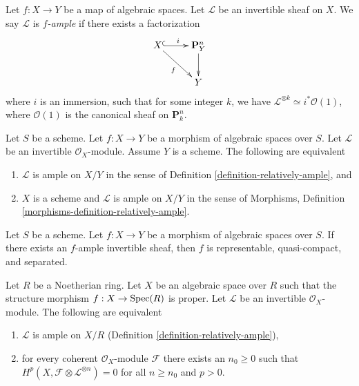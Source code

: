 \begin{definition}[{\cite[II, Def.\ 7.9]{Kn}}]\label{definition-knutson-ample}
  Let $f : X \to Y$ be a map of algebraic spaces. Let $\mathcal{L}$ be an
  invertible sheaf on $X$. We say $\mathcal{L}$ is {\it $f$-ample} if there
  exists a factorization
  $$
  \xymatrix{
    X \ar@{^{(}->}[r]^i\ar[dr]_f & \mathbf{P}^n_Y \ar[d]\\
    & Y
  }
  $$
  where $i$ is an immersion, such that for some integer $k$, we have
  $\mathcal{L}^{\otimes k} \simeq i^*\mathcal{O}(1)$, where $\mathcal{O}(1)$ is
  the canonical sheaf on $\mathbf{P}^n_k$.
\end{definition}

\begin{lemma}
\label{lemma-relatively-ample-sanity-check}
Let $S$ be a scheme.
Let $f : X \to Y$ be a morphism of algebraic spaces over $S$.
Let $\mathcal{L}$ be an invertible $\mathcal{O}_X$-module.
Assume $Y$ is a scheme. The following are equivalent
\begin{enumerate}
\item $\mathcal{L}$ is ample on $X/Y$ in the sense of
Definition \ref{definition-relatively-ample}, and
\item $X$ is a scheme and $\mathcal{L}$ is ample on $X/Y$
in the sense of
Morphisms, Definition \ref{morphisms-definition-relatively-ample}.
\end{enumerate}
\end{lemma}

\begin{lemma}
\label{lemma-relatively-ample-properties}
Let $S$ be a scheme.
Let $f : X \to Y$ be a morphism of algebraic spaces over $S$.
If there exists an $f$-ample invertible sheaf, then
$f$ is representable, quasi-compact, and separated.
\end{lemma}

\begin{lemma}
Let $R$ be a Noetherian ring. Let $X$ be an algebraic space over $R$
such that the structure morphism $f : X \to \mathop{\rm Spec}(R)$ is proper.
Let $\mathcal{L}$ be an invertible $\mathcal{O}_X$-module.
The following are equivalent
\begin{enumerate}
\item $\mathcal{L}$ is ample on $X/R$
(Definition \ref{definition-relatively-ample}),
\item for every coherent $\mathcal{O}_X$-module $\mathcal{F}$
there exists an $n_0 \geq 0$ such that
$H^p(X, \mathcal{F} \otimes \mathcal{L}^{\otimes n}) = 0$
for all $n \geq n_0$ and $p > 0$.
\end{enumerate}
\end{lemma}

